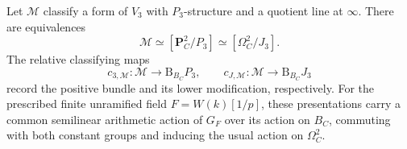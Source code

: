 \begin{lemma}\label{h3:rat:modification-presentations}
Let $\mathcal M$ classify a form of $V_3$ with $P_3$-structure
and a quotient line at $\infty$.  There are equivalences
\begin{equation}\label{h3:eq:rat-two-presentations}
 \mathcal M\simeq[\mathbf P^2_C/P_3]
                 \simeq[\Omega_C^2/J_3].
\end{equation}
The relative classifying maps
\[
 c_{3,\mathcal M}:\mathcal M\longrightarrow\mathrm B_{B_C}P_3,
 \qquad
 c_{J,\mathcal M}:\mathcal M\longrightarrow\mathrm B_{B_C}J_3
\]
record the positive bundle and its lower modification, respectively.
For the prescribed finite unramified field $F=W(k)[1/p]$, these
presentations carry a common semilinear arithmetic action of $G_F$
over its action on $B_C$, commuting with both constant groups and
inducing the usual action on $\Omega_C^2$.
\end{lemma}

